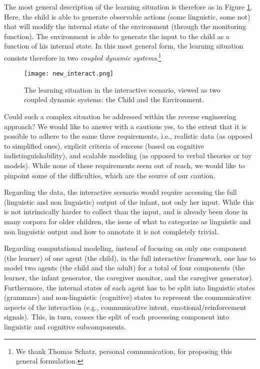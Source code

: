 \documentclass[jou,apacite]{apa6}
\begin{document}
The most general description of the learning situation is therefore as in Figure \ref{fig:relaf2}. Here, the child is able to generate observable actions (some linguistic, some not) that will modify the internal state of the environment (through the monitoring function). The environment is able to generate the input to the child as a function of his internal state. In this most general form, the learning situation consists therefore in two \emph{coupled dynamic systems}.\footnote{We thank Thomas Schatz, personal communication, for proposing this general formulation.} 

\begin{figure}
	\centering
	\texttt{[image: new\_interact.png]}
	\caption{The learning situation in the interactive scenario, viewed as two coupled dynamic systems: the Child and the Environment.}
	\label{fig:relaf2}
\end{figure}

Could such a complex situation be addressed within the reverse engineering approach? We would like to answer with a cautious yes, to the extent that it is possible to adhere to the same three requirements, i.e., realistic data (as opposed to simplified ones),  explicit criteria of success (based on cognitive indistinguishability), and scalable modeling (as opposed to verbal theories or toy models).   While none of these requirements seem out of reach, we would like to pinpoint some of the difficulties, which are the source of our caution. 

Regarding the data, the interactive scenario would require accessing the full (linguistic and non linguistic) output of the infant, not only her input. While this is not intrinsically harder to collect than the input, and is already been done in many corpora for older children, the issue of what to categorize as linguistic and non linguistic output and how to annotate it  is not completely trivial.  

Regarding computational modeling, instead of focusing on only one component (the learner) of one agent (the child), in the full interactive framework, one has to model two agents (the child and the adult) for a total of four components (the learner, the infant generator, the caregiver monitor, and the caregiver generator). Furthermore, the internal states of each agent has to be split into linguistic states (grammars) and non-linguistic (cognitive) states to represent the communicative aspects of the interaction (e.g., communicative intent, emotional/reinforcement signals). This, in turn, causes the split of each processing component into linguistic and cognitive subcomponents.
\end{document}
